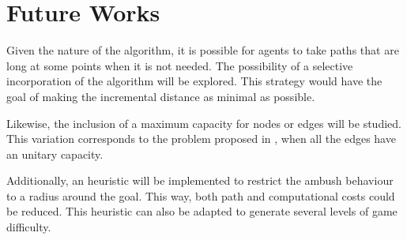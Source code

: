 \section{Future Works}


Given the nature of the algorithm, it is possible for agents to
take paths that are long at some points when it is not needed. 
The possibility of a selective incorporation of the algorithm will
be explored. This strategy would have the goal of making the
 incremental distance as minimal as possible.

Likewise, the inclusion of a maximum capacity for nodes or edges
will be studied. This variation corresponds to the problem proposed in
\cite{art3}, when all the edges have an unitary capacity. 

Additionally, an heuristic will be implemented to restrict the 
ambush behaviour to a radius around the goal. This way, 
both path and computational costs could be reduced. 
This heuristic can also be adapted to generate several levels
of game difficulty.


  